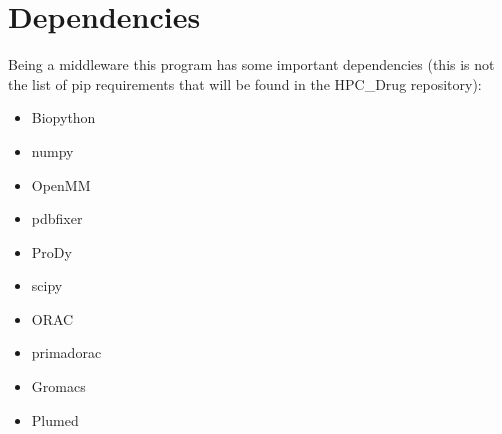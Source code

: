 

\chapter{Dependencies}

Being a middleware this program has some important dependencies (this is not the list of pip requirements that will be found in the HPC\_Drug repository):
\begin{itemize}
    \item Biopython \cite{biopython}
    \item numpy \cite{numpy}
    \item OpenMM \cite{openmm}
    \item pdbfixer \cite{pdbfixer}
    \item ProDy \cite{prody}
    \item scipy \cite{scipy}
    \item ORAC \cite{orac}
    \item primadorac \cite{primadorac}
    \item Gromacs \cite{gromacs_ABRAHAM201519}
    \item Plumed \cite{plumed}
\end{itemize}
